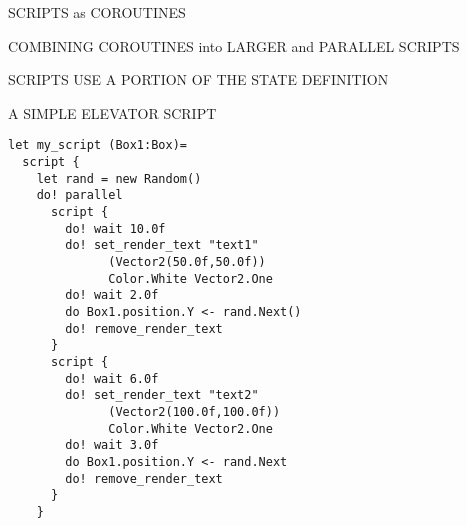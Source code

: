 
SCRIPTS as COROUTINES

COMBINING COROUTINES into LARGER and PARALLEL SCRIPTS

SCRIPTS USE A PORTION OF THE STATE DEFINITION

A SIMPLE ELEVATOR SCRIPT


\begin{lstlisting}
let my_script (Box1:Box)=
  script {
    let rand = new Random()
    do! parallel
      script { 
        do! wait 10.0f 
        do! set_render_text "text1" 
              (Vector2(50.0f,50.0f)) 
              Color.White Vector2.One
        do! wait 2.0f 
        do Box1.position.Y <- rand.Next()
        do! remove_render_text
      }
      script { 
        do! wait 6.0f 
        do! set_render_text "text2"
              (Vector2(100.0f,100.0f)) 
              Color.White Vector2.One
        do! wait 3.0f 
        do Box1.position.Y <- rand.Next
        do! remove_render_text
      }
    }
\end{lstlisting}
